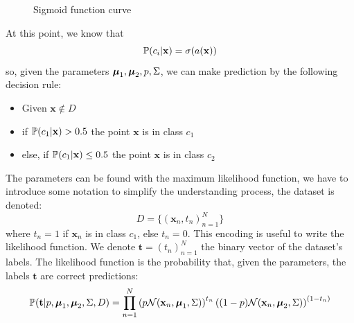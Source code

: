 \documentclass[10pt, letterpaper]{report}
\begin{document}
\begin{figure}[h!]
	\centering
	\caption{Sigmoid function curve}
\end{figure}
At this point, we know that
\begin{equation}
	{\mathbb P}(c_i|\mathbf x)=\sigma(a(\mathbf x))
\end{equation}
so, given the parameters ${\boldsymbol{\mu}}_1,{\boldsymbol{\mu}}_2,p,\Sigma$, we can make prediction by the following decision rule:
\begin{itemize}
	\item Given $\mathbf x\notin D$
	\item if ${\mathbb P}(c_1|\mathbf x)>0.5$ the point $\mathbf x$ is in class $c_1$
	\item else, if ${\mathbb P}(c_1|\mathbf x)\le0.5$ the point $\mathbf x$ is in class $c_2$
\end{itemize}

The parameters can be found with the maximum likelihood function, we have to introduce some notation to simplify the understanding process, the dataset is denoted:
\begin{equation}
	D=\{(\mathbf x_n,t_n)_{n=1}^N\}
\end{equation}
where $t_n=1$ if $\mathbf x_n$ is in class $c_1$, else $t_n=0$. This encoding is useful to write the likelihood function. We denote $\mathbf t=(t_n)_{n=1}^N$ the binary vector of the dataset's labels. The likelihood function is the probability that, given the parameters, the labels $\mathbf t$ are correct predictions:
\begin{equation}
	{\mathbb P}(\mathbf t|p,{\boldsymbol{\mu}}_1,{\boldsymbol{\mu}}_2,\Sigma,D)=\prod_{n=1}^{N}
	\left(
	p\mathcal N(\mathbf x_n,{\boldsymbol{\mu}}_1,\Sigma)
	\right)^{t_n}
	\left(
	(1-p)\mathcal N(\mathbf x_n,{\boldsymbol{\mu}}_2,\Sigma)
	\right)^{(1-t_n)}
\end{equation}
\end{document}
